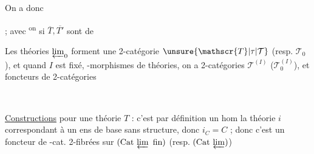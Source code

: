 

On a donc


; avec \textsuperscript{on}  \unsure{$\simeq$|---} si $\overline{T},\overline{T'}$ sont de  

Les théories  $\varprojlim_0$  forment une 2-catégorie  $\unsure{\mathscr{T}|\tau|\mathcal{T}}$ (resp. $\mathscr{T}_0$), et quand $I$ est fixé,   -morphismes de théories, on a  2-catégories $\mathscr{T}^{(I)}$ ($\mathscr{T}_0^{(I)}$), et   foncteurs de 2-catégories


\\

\uline{Constructions}  pour une  théorie $T$ : c'est par définition un hom  la théorie $i$  correspondant à un ens de base sans structure, donc $i_C=C$ ; donc c'est un foncteur de -cat. 2-fibrées sur $(\mathrm{Cat}\,\varprojlim\ \text{fin})$ (resp. $(\mathrm{Cat}\,\varprojlim)$)

